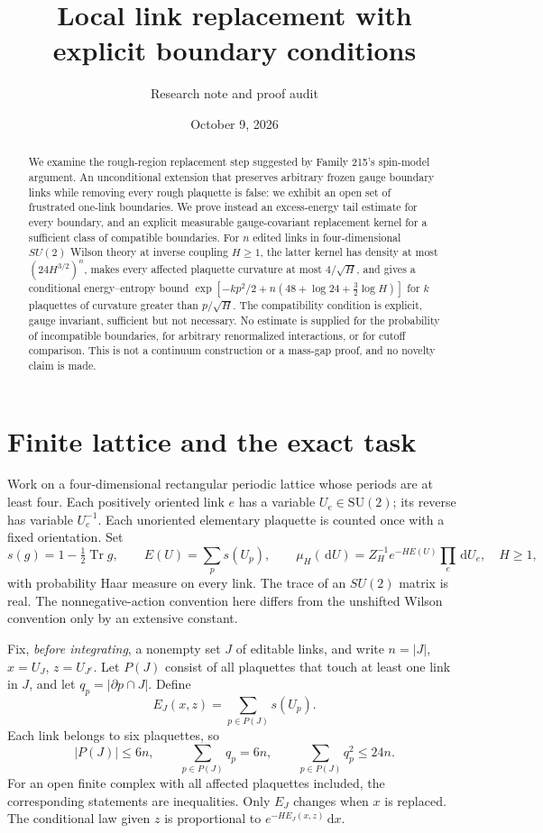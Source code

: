 \documentclass[11pt]{article}
\title{Local link replacement with explicit boundary conditions}
\author{Research note and proof audit}
\date{October 9, 2026}
\theoremstyle{definition}
\theoremstyle{remark}
\newcommand{\Tr}{\operatorname{Tr}}
\newcommand{\dd}{\,\mathrm d}
\newcommand{\SU}{\mathrm{SU}(2)}
\begin{document}
\maketitle
\begin{abstract}
We examine the rough-region replacement step suggested by Family 215's
spin-model argument. An unconditional extension that preserves arbitrary
frozen gauge boundary links while removing every rough plaquette is false:
we exhibit an open set of frustrated one-link boundaries. We prove instead
an excess-energy tail estimate for every boundary, and an explicit
measurable gauge-covariant replacement kernel for a sufficient class of
compatible boundaries. For $n$ edited links in four-dimensional $SU(2)$
Wilson theory at inverse coupling $H\ge1$, the latter kernel has density
at most $(24H^{3/2})^n$, makes every affected plaquette curvature at most
$4/\sqrt H$, and gives a conditional energy--entropy bound
$\exp[-kp^2/2+n(48+\log24+\tfrac32\log H)]$ for $k$ plaquettes of
curvature greater than $p/\sqrt H$.
The compatibility condition is explicit, gauge invariant, sufficient but
not necessary. No estimate is supplied for the probability of incompatible
boundaries, for arbitrary renormalized interactions, or for cutoff
comparison. This is not a continuum construction or a mass-gap proof,
and no novelty claim is made.
\end{abstract}
\tableofcontents

\section{Finite lattice and the exact task}
Work on a four-dimensional rectangular periodic lattice whose periods are
at least four. Each positively oriented link $e$ has a variable
$U_e\in\SU$; its reverse has variable $U_e^{-1}$. Each unoriented elementary
plaquette is counted once with a fixed orientation. Set
\begin{equation}
 s(g)=1-\tfrac12\Tr g,\qquad
 E(U)=\sum_p s(U_p),\qquad
 \mu_H(\dd U)=Z_H^{-1}e^{-HE(U)}\prod_e\dd U_e,
 \quad H\ge1,
 \label{eq:model}
\end{equation}
with probability Haar measure on every link. The trace of an $SU(2)$
matrix is real. The nonnegative-action convention here differs from the
unshifted Wilson convention only by an extensive constant.

Fix, \emph{before integrating}, a nonempty set $J$ of editable links, and
write $n=|J|$, $x=U_J$, $z=U_{J^c}$. Let $P(J)$ consist of all plaquettes
that touch at least one link in $J$, and let $q_p=|\partial p\cap J|$.
Define
\[
 E_J(x,z)=\sum_{p\in P(J)}s(U_p).
\]
Each link belongs to six plaquettes, so
\begin{equation}
 |P(J)|\le6n,\qquad \sum_{p\in P(J)}q_p=6n,\qquad
 \sum_{p\in P(J)}q_p^2\le24n.\label{eq:incidence}
\end{equation}
For an open finite complex with all affected plaquettes included, the
corresponding statements are inequalities. Only $E_J$ changes when $x$
is replaced. The conditional law given $z$ is proportional to
$e^{-HE_J(x,z)}\dd x$.
\end{document}
